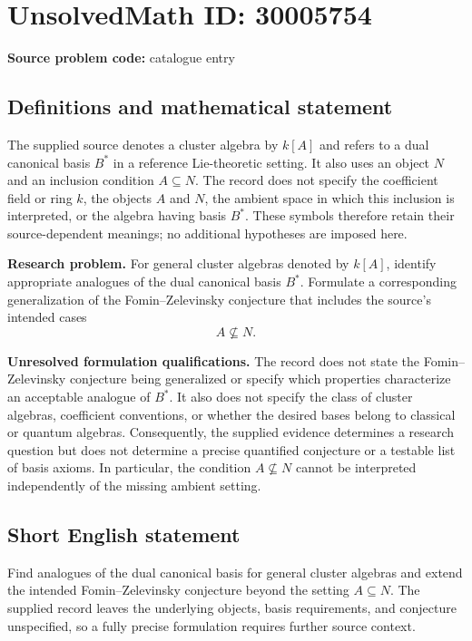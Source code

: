 \documentclass[11pt]{article}
\begin{document}
\section*{UnsolvedMath ID: 30005754}
\textbf{Source problem code:} catalogue entry
\subsection{Definitions and mathematical statement}
The supplied source denotes a cluster algebra by \(k[A]\) and refers to a dual canonical basis \(B^*\) in a reference Lie-theoretic setting. It also uses an object \(N\) and an inclusion condition \(A\subseteq N\). The record does not specify the coefficient field or ring \(k\), the objects \(A\) and \(N\), the ambient space in which this inclusion is interpreted, or the algebra having basis \(B^*\). These symbols therefore retain their source-dependent meanings; no additional hypotheses are imposed here.

\textbf{Research problem.} For general cluster algebras denoted by \(k[A]\), identify appropriate analogues of the dual canonical basis \(B^*\). Formulate a corresponding generalization of the Fomin--Zelevinsky conjecture that includes the source's intended cases
\[
A\not\subseteq N.
\]

\textbf{Unresolved formulation qualifications.} The record does not state the Fomin--Zelevinsky conjecture being generalized or specify which properties characterize an acceptable analogue of \(B^*\). It also does not specify the class of cluster algebras, coefficient conventions, or whether the desired bases belong to classical or quantum algebras. Consequently, the supplied evidence determines a research question but does not determine a precise quantified conjecture or a testable list of basis axioms. In particular, the condition \(A\not\subseteq N\) cannot be interpreted independently of the missing ambient setting.
\subsection{Short English statement}
Find analogues of the dual canonical basis for general cluster algebras and extend the intended Fomin--Zelevinsky conjecture beyond the setting \(A\subseteq N\). The supplied record leaves the underlying objects, basis requirements, and conjecture unspecified, so a fully precise formulation requires further source context.
\end{document}
